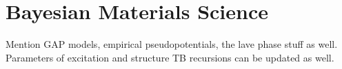 \chapter{Bayesian Materials Science}
Mention GAP models, empirical pseudopotentials, the lave phase stuff as well.
Parameters of excitation and structure TB recursions can be updated as well.
